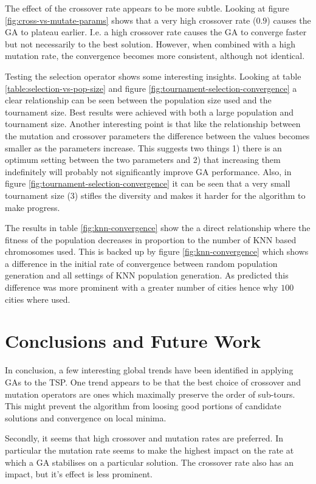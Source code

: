 \documentclass[journal]{IEEEtran}
\begin{document}
The effect of the crossover rate appears to be more subtle. Looking at figure \ref{fig:cross-vs-mutate-params} shows that a very high crossover rate ($0.9$) causes the GA to plateau earlier. I.e. a high crossover rate causes the GA to converge faster but not necessarily to the best solution. However, when combined with a high mutation rate, the convergence becomes more consistent, although not identical.

Testing the selection operator shows some interesting insights. Looking at table \ref{table:selection-vs-pop-size} and figure \ref{fig:tournament-selection-convergence} a clear relationship can be seen between the population size used and the tournament size. Best results were achieved with both a large population and tournament size. Another interesting point is that like the relationship between the mutation and crossover parameters the difference between the values becomes smaller as the parameters increase. This suggests two things 1)  there is an optimum setting between the two parameters and 2) that increasing them indefinitely will probably not significantly improve GA performance. Also, in figure \ref{fig:tournament-selection-convergence} it can be seen that a very small tournament size ($3$) stifles the diversity and makes it harder for the algorithm to make progress.

The results in table \ref{fig:knn-convergence} show the a direct relationship where the fitness of the population decreases in proportion to the number of KNN based chromosomes used. This is backed up by figure \ref{fig:knn-convergence} which shows a difference in the initial rate of convergence between random population generation and all settings of KNN population generation. As predicted this difference was more prominent with a greater number of cities hence why $100$ cities where used.

\section{Conclusions and Future Work}
In conclusion, a few interesting global trends have been identified in applying GAs to the TSP. One trend appears to be that the best choice of crossover and mutation operators are ones which maximally preserve the order of sub-tours. This might prevent the algorithm from loosing good portions of candidate solutions and convergence on local minima.

Secondly, it seems that high crossover and mutation rates are preferred. In particular the mutation rate seems to make the highest impact on the rate at which a GA stabilises on a particular solution. The crossover rate also has an impact, but it's effect is less prominent.
\end{document}
